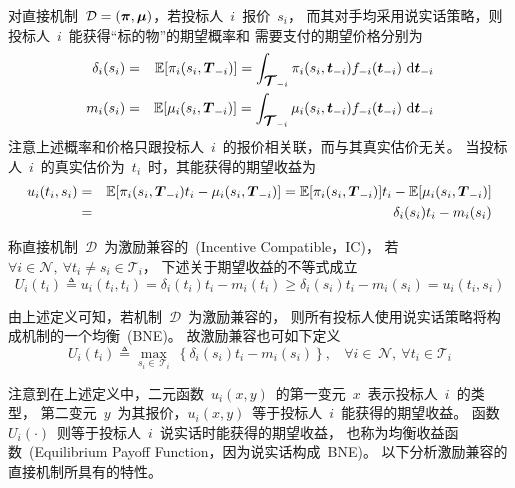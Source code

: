 \documentclass[a4paper,12pt]{article}
\newcommand{\mv}[1]{\mbox{\boldmath$#1$}}         %
\newcommand{\id}{\mathrm{d}}                      %
\begin{document}
对直接机制~$\mathcal{D}=(\mv{\pi},\mv{\mu})$，若投标人~$i$~报价~$s_i$，
而其对手均采用说实话策略，则投标人~$i$~能获得``标的物''的期望概率和
需要支付的期望价格分别为
 \begin{eqnarray}
\label{mech:definition:expected:prob}
\delta_i(s_i) &=& \mathbb{E}[\pi_i(s_i, \mv{T}_{-i})] = \int_{\mv{\mathcal{T}}_{-i}}
    \pi_i(s_i,\mv{t}_{-i})f_{-i}(\mv{t}_{-i})~\id\mv{t}_{-i}\\
\label{mech:definition:expected:payment}
  m_i(s_i) &=& \mathbb{E}[\mu_i(s_i, \mv{T}_{-i})] = \int_{\mv{\mathcal{T}}_{-i}}
    \mu_i(s_i,\mv{t}_{-i})f_{-i}(\mv{t}_{-i})~\id\mv{t}_{-i}
\end{eqnarray}
注意上述概率和价格只跟投标人~$i$~的报价相关联，而与其真实估价无关。
当投标人~$i$~的真实估价为~$t_i$~时，其能获得的期望收益为
\begin{eqnarray}
    \nonumber
    u_i(t_i,s_i) &=& \mathbb{E}[\pi_i(s_i, \mv{T}_{-i})t_i - \mu_i(s_i, \mv{T}_{-i})] 
                  =  \mathbb{E}[\pi_i(s_i, \mv{T}_{-i})]t_i - \mathbb{E}[\mu_i(s_i, \mv{T}_{-i})] \\
                 &=& \delta_i(s_i)t_i - m_i(s_i)
		 \label{mech:definition:expected:payoff}
\end{eqnarray}

称直接机制~$\mathcal{D}$~为激励兼容的~(Incentive
Compatible，IC)，
若~$\forall i\in\mathcal{N}, ~\forall t_i\neq s_i\in\mathcal{T}_i$，
下述关于期望收益的不等式成立
\begin{equation}\label{mech:definition:ic:inequality}
    U_i(t_i) \triangleq u_i(t_i,t_i) = \delta_i(t_i)t_i - m_i(t_i)
                \ge \delta_i(s_i)t_i - m_i(s_i) = u_i(t_i,s_i)
\end{equation}

由上述定义可知，若机制~$\mathcal{D}$~为激励兼容的，
则所有投标人使用说实话策略将构成机制的一个均衡~(BNE)。
故激励兼容也可如下定义
\begin{equation}\label{mech:definition:ic:max}
    U_i(t_i) \triangleq \max_{s_i\in\,\mathcal{T}_i}
                 ~\left\{\delta_i(s_i)t_i - m_i(s_i)\right\},
                 ~~~~\forall i\in\,\mathcal{N},~\forall t_i\in\mathcal{T}_i
\end{equation}

注意到在上述定义中，二元函数~$u_i(x,y)$~的第一变元~$x$~表示投标人~$i$~的类型，
第二变元~$y$~为其报价，$u_i(x,y)$~等于投标人~$i$~能获得的期望收益。
函数~$U_i(\cdot)$~则等于投标人~$i$~说实话时能获得的期望收益，
也称为均衡收益函数~(Equilibrium Payoff Function，因为说实话构成~BNE)。
以下分析激励兼容的直接机制所具有的特性。\vspace{5pt}
\end{document}
